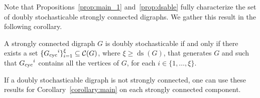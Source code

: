 \documentclass[final]{siamltex}
\begin{document}
Note that Propositions~\ref{prop:main_1} and~\ref{prop:dsable} fully
characterize the set of doubly stochasticable strongly connected
digraphs. We gather this result in the following corollary.
\begin{corollary}\label{corollary:main}
  A strongly connected digraph $G$ is doubly stochasticable if and
  only if there exists a set $ \{{{G}_{\textup{{cyc}}}}^i\}_{i=1}^{\xi}
  \subseteq \mathcal{C}(G) $, where $ \xi \geq {\operatorname{ds}}(G) $, that generates
  $G$ and such that $ {{G}_{\textup{{cyc}}}}^i $ contains all the vertices of
  $ G $, for each $ i\in \{1,\ldots, \xi\} $.
\end{corollary}

If a doubly stochasticable digraph is not strongly connected, one can
use these results for Corollary~\ref{corollary:main} on each strongly
connected component.
\end{document}
